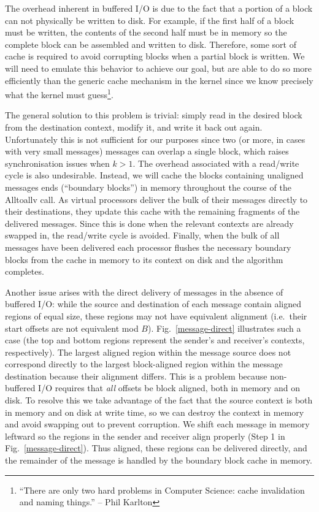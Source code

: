 \documentclass[12pt]{carletoncsthesis}
\begin{document}
The overhead inherent in buffered I/O is due to the fact that a portion of
a block can not physically be written to disk.  For example, if the first
half of a block must be written, the contents of the second half must be in
memory so the complete block can be assembled and written to disk.  Therefore,
some sort of cache is required to avoid corrupting blocks when a partial block
is written.  We will need to emulate this behavior to achieve our goal, but
are able to do so more efficiently than the generic cache mechanism in the
kernel since we know precisely what the kernel must guess\footnote{``There
are only two hard problems in Computer Science: cache invalidation and naming
things.'' -- Phil Karlton}.

The general solution to this problem is trivial: simply read in the desired
block from the destination context, modify it, and write it back out again.
Unfortunately this is not sufficient for our purposes since two (or more,
in cases with very small messages) messages can overlap a single block,
which raises synchronisation issues when $k > 1$.  The overhead associated
with a read/write cycle is also undesirable.  Instead, we will cache the
blocks containing unaligned messages ends (``boundary blocks'') in memory
throughout the course of the Alltoallv call.  As virtual processors deliver
the bulk of their messages directly to their destinations, they update this
cache with the remaining fragments of the delivered messages.  Since this is
done when the relevant contexts are already swapped in, the read/write cycle
is avoided.  Finally, when the bulk of all messages have been delivered each
processor flushes the necessary boundary blocks from the cache in memory to
its context on disk and the algorithm completes.

Another issue arises with the direct delivery of messages in the absence
of buffered I/O: while the source and destination of each message contain
aligned regions of equal size, these regions may not have equivalent
alignment (i.e.\ their start offsets are not equivalent mod $B$).
Fig.~\ref{message-direct} illustrates such a case (the top and bottom
regions represent the sender's and receiver's contexts, respectively).
The largest aligned region within the message source does not correspond
directly to the largest block-aligned region within the message destination
because their alignment differs.  This is a problem because non-buffered I/O
requires that {\em all} offsets be block aligned, both in memory and on disk.
To resolve this we take advantage of the fact that the source context is
both in memory and on disk at write time, so we can destroy the context in
memory and avoid swapping out to prevent corruption.  We shift each message
in memory leftward so the regions in the sender and receiver align properly
(Step 1 in Fig.~\ref{message-direct}).  Thus aligned, these regions can
be delivered directly, and the remainder of the message is handled by the
boundary block cache in memory.
\end{document}
